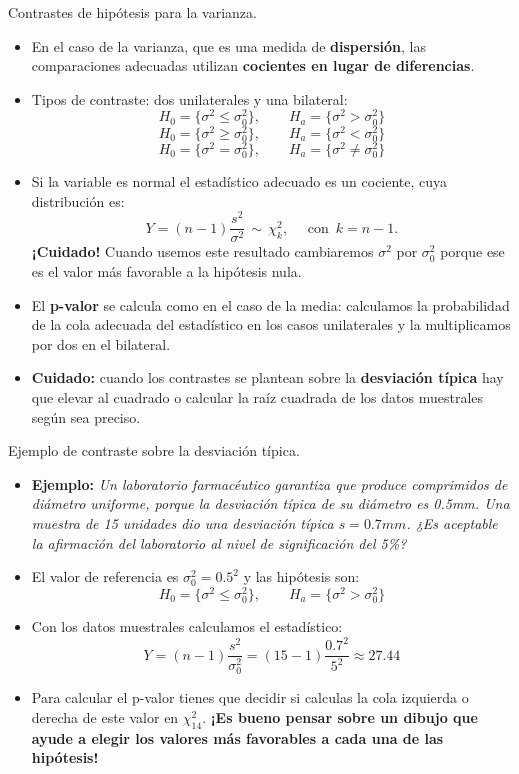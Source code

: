 \documentclass[
  9pt,
  ignorenonframetext,
]{beamer}
\begin{document}
\begin{frame}{Contrastes de hipótesis para la varianza.}
\protect\hypertarget{contrastes-de-hipotesis-para-la-varianza.}{}

\begin{itemize}
\item
  En el caso de la varianza, que es una medida de \textbf{dispersión},
  las comparaciones adecuadas utilizan \textbf{cocientes en lugar de
  diferencias}.
\item
  Tipos de contraste: dos unilaterales y una bilateral:
  \[H_0 = \{\sigma^2 \leq \sigma^2_0\}, \qquad H_a = \{\sigma^2 > \sigma^2_0\}\]
  \[H_0 = \{\sigma^2 \geq \sigma^2_0\}, \qquad H_a = \{\sigma^2 < \sigma^2_0\}\]
  \[H_0 = \{\sigma^2 = \sigma^2_0\}, \qquad H_a = \{\sigma^2 \neq \sigma^2_0\}\]
\item
  Si la variable es normal el estadístico adecuado es un cociente, cuya
  distribución es:
  \[Y = (n-1)\dfrac{s^2}{\sigma^2}\, \sim\,\chi^2_k,\quad\mbox{ con }\,k=n-1.\]
  \textbf{¡Cuidado!} Cuando usemos este resultado cambiaremos
  \(\sigma^2\) por \(\sigma^2_0\) porque ese es el valor más favorable a
  la hipótesis nula.
\item
  El \textbf{p-valor} se calcula como en el caso de la media: calculamos
  la probabilidad de la cola adecuada del estadístico en los casos
  unilaterales y la multiplicamos por dos en el bilateral.
\item
  \textbf{Cuidado:} cuando los contrastes se plantean sobre la
  \textbf{desviación típica} hay que elevar al cuadrado o calcular la
  raíz cuadrada de los datos muestrales según sea preciso.
\end{itemize}

\end{frame}

\begin{frame}{Ejemplo de contraste sobre la desviación típica.}
\protect\hypertarget{ejemplo-de-contraste-sobre-la-desviacion-tipica.}{}

\begin{itemize}
\item
  \textbf{Ejemplo:} \emph{Un laboratorio farmacéutico garantiza que
  produce comprimidos de diámetro uniforme, porque la desviación típica
  de su diámetro es 0.5mm. Una muestra de 15 unidades dio una desviación
  típica \(s = 0.7mm\). ¿Es aceptable la afirmación del laboratorio al
  nivel de significación del 5\%?}
\item
  El valor de referencia es \(\sigma_0^2 = 0.5^2\) y las hipótesis son:
  \[H_0 = \{\sigma^2 \leq \sigma^2_0\}, \qquad H_a = \{\sigma^2 > \sigma^2_0\}\]
\item
  Con los datos muestrales calculamos el estadístico: \[
  Y = (n-1)\dfrac{s^2}{\sigma_0^2} = (15 - 1) \dfrac{0.7^2}{5^2}
  \approx 27.44
  \]
\item
  Para calcular el p-valor tienes que decidir si calculas la cola
  izquierda o derecha de este valor en \(\chi^2_{14}\). \textbf{¡Es
  bueno pensar sobre un dibujo que ayude a elegir los valores más
  favorables a cada una de las hipótesis!}
\end{itemize}

\end{frame}
\end{document}
